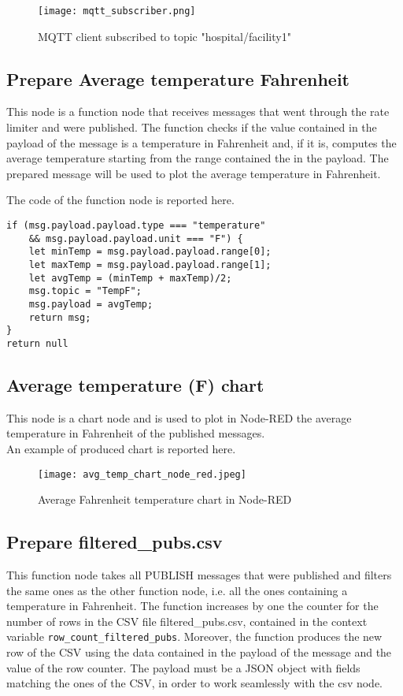 \begin{figure}[H]
    \centering
    \texttt{[image: mqtt\_subscriber.png]}
    \caption{MQTT client subscribed to topic "hospital/facility1"}
\end{figure}

\subsection{Prepare Average temperature Fahrenheit}
This node is a function node that receives messages that went through the rate limiter and were published. The function checks if the value contained in the payload of the message is a temperature in Fahrenheit and, if it is, computes the average temperature starting from the range contained the in the payload. The prepared message will be used to plot the average temperature in Fahrenheit.

The code of the function node is reported here.
\begin{verbatim}
if (msg.payload.payload.type === "temperature" 
	&& msg.payload.payload.unit === "F") {
    let minTemp = msg.payload.payload.range[0];    
    let maxTemp = msg.payload.payload.range[1];
    let avgTemp = (minTemp + maxTemp)/2;
    msg.topic = "TempF";
    msg.payload = avgTemp;
    return msg;
}
return null
\end{verbatim}

\subsection{Average temperature (F) chart}
This node is a chart node and is used to plot in Node-RED the average temperature in Fahrenheit of the published messages.\\
An example of produced chart is reported here.

\begin{figure}[H]
    \centering
    \texttt{[image: avg\_temp\_chart\_node\_red.jpeg]}
    \caption{Average Fahrenheit temperature chart in Node-RED}
\end{figure}

\subsection{Prepare filtered\_pubs.csv}
This function node takes all PUBLISH messages that were published and filters the same ones as the other function node, i.e. all the ones containing a temperature in Fahrenheit. The function increases by one the counter for the number of rows in the CSV file filtered\_pubs.csv, contained in the context variable \verb|row_count_filtered_pubs|. Moreover, the function produces the new row of the CSV using the data contained in the payload of the message and the value of the row counter. The payload must be a JSON object with fields matching the ones of the CSV, in order to work seamlessly with the csv node.

